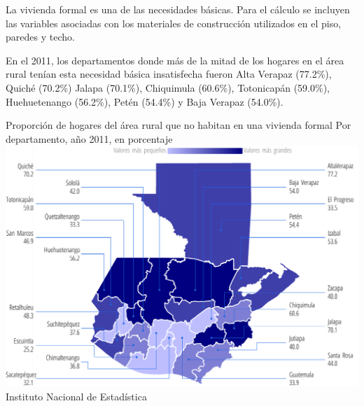  
 
 
      
      {%
  La vivienda formal es una de las necesidades básicas. Para el cálculo se incluyen las variables asociadas con los materiales de construcción utilizados en el piso, paredes y techo. 
   
   En el 2011, los departamentos donde más de la mitad de los hogares en el área rural tenían esta necesidad básica insatisfecha fueron Alta Verapaz (77.2\%), Quiché (70.2\%) Jalapa (70.1\%), Chiquimula (60.6\%), Totonicapán (59.0\%), Huehuetenango (56.2\%),  Petén (54.4\%) y Baja Verapaz (54.0\%).  }%
      {%
      	Proporción de hogares del área rural que no habitan en una vivienda formal
      } %
      {%
      	Por departamento, año 2011, en porcentaje} %
      {%
      	\includegraphics[width=52\cuadri]{graficas/1_12.pdf}}%
      {%
      	Instituto Nacional de Estadística} %
      
      
        
